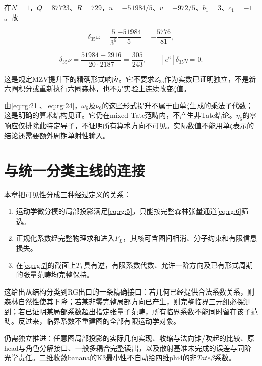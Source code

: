 \documentclass[11pt,a4paper,oneside]{ctexrep}
\theoremstyle{cnplain}
\theoremstyle{definition}
\theoremstyle{remark}
\newcommand{\tightlist}{\setlength{\itemsep}{0pt}\setlength{\parskip}{0pt}}
\begin{document}
在\(N=1\)，\(Q=87723\)、\(R=729\)，\(u=-51984/5\)、\(v=-972/5\)、\(b_1=3\)、\(c_1=-1\)。故

\begin{equation}
[e^6]\delta_{35}\omega=\frac5{3^6}\frac{-51984}5
      =-\frac{5776}{81},
\end{equation}

\begin{equation}
[e^6]\delta_{35}\nu
   =\frac{51984+2916}{20\cdot2187}
   =\frac{305}{243},\qquad [e^6]\delta_{35}\eta=0.   \label{eq:rg:24}
\end{equation}

这是规定MZV提升下的精确形式响应。它不要求\(Z_{35}\)作为实数已证明独立，不是新六圈积分或重新执行六圈森林，也不是实验上连续改变\(\zeta\)值。

由\eqref{eq:rg:21}、\eqref{eq:rg:24}，\(\omega _6\)及\(\nu _6\)的这些形式提升不属于由单\(\zeta\)生成的乘法子代数；这是明确的算术结构见证。它仍在mixed Tate范畴内，不产生非Tate结论。\(\eta _6\)的零响应仅排除此特定导子，不证明所有算术方向不可见。实际数值不能用单\(\zeta\)表示的结论还需要额外周期单射性输入。

\section{与统一分类主线的连接}\label{sec:rg:8}

本章把可见性分成三种经过定义的关系：

\begin{enumerate}
\def\labelenumi{\arabic{enumi}.}
\tightlist
\item
  运动学微分模的局部投影满足\eqref{eq:rg:5}，只能按完整森林张量通道\eqref{eq:rg:6}筛选。
\item
  正规化系数经完整物理求和进入\(F_L\)，其核可含图间相消、分子约束和有限信息损失。
\item
  在\eqref{eq:rg:7}的截面上\(T_L\)具有逆，有限系数代数、允许一阶方向及已有形式周期的张量范畴均完整保持。
\end{enumerate}

这给出从结构分类到RG出口的一条精确接口：若几何已经提供合法系数关系，则森林自然性使其下降；若某非零完整局部方向已产生，则完整临界三元组必探测到；若已证明某局部系数超出指定张量子范畴，所有临界系数不能同时留在该子范畴。反过来，临界系数不重建图的全部有限运动学对象。

仍需独立推进：任意图局部投影的实际几何实现、收缩与法向锥/吹起的比较、原head与角色分解接口、一般多耦合完整读出，以及散射基准未完成的误差与同阶光学责任。二维收敛banana的K3最小性不自动给四维phi4的非\(Tate \beta\)系数。
\end{document}
